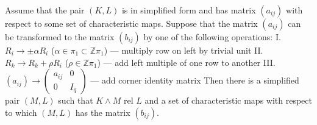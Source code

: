 Assume that the pair $(K, L)$ is in simplified form and has matrix $(a_{ij})$ with respect to some set of characteristic maps. Suppose that the matrix $(a_{ij})$ can be transformed to the matrix $(b_{ij})$ by one of the following operations:
I. $R_i \rightarrow \pm \alpha R_i$ ($\alpha \in \pi_1 \subset \mathbb{Z}\pi_1$) — multiply row on left by trivial unit
II. $R_k \rightarrow R_k + \rho R_i$ ($\rho \in \mathbb{Z}\pi_1$) — add left multiple of one row to another
III. $(a_{ij}) \rightarrow \begin{pmatrix} a_{ij} & 0 \\ 0 & I_q \end{pmatrix}$ — add corner identity matrix
Then there is a simplified pair $(M, L)$ such that $K \wedge M$ rel $L$ and a set of characteristic maps with respect to which $(M, L)$ has the matrix $(b_{ij})$.
